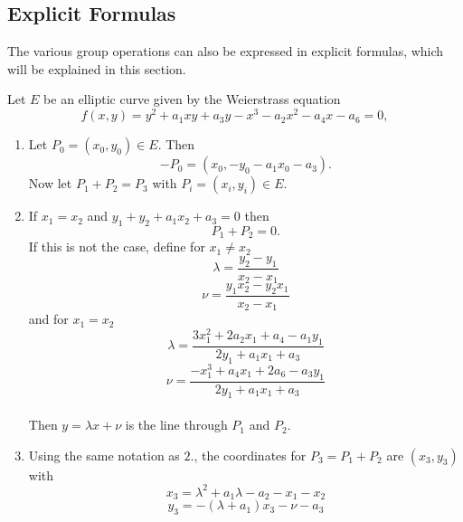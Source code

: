 \subsection{Explicit Formulas}
The various group operations can also be expressed in explicit formulas, which will be explained in this section.
\begin{thm}
	Let $E$ be an elliptic curve given by the Weierstrass equation
	\begin{equation*}
	f(x,y)=y^2+a_1xy+a_3y-x^3-a_2x^2-a_4x-a_6=0,
	\end{equation*}
	\text\linebreak
	\begin{enumerate}
		\item Let $P_0=(x_0,y_0)\in E$. Then
		\begin{equation*}
		-P_0=(x_0,-y_0-a_1x_0-a_3).
		\end{equation*}
		Now let $P_1+P_2=P_3$ with $P_i=(x_i,y_i)\in E$.
		\item If $x_1=x_2$ and $y_1+y_2+a_1x_2+a_3=0$ then
		\begin{equation*}
		P_1+P_2=0.
		\end{equation*}
		If this is not the case, define for $x_1\neq x_2$
		\begin{equation*}
		\lambda=\frac{y_2-y_1}{x_2-x_1}
		\end{equation*}
		\begin{equation*}
		\nu=\frac{y_1x_2-y_2x_1}{x_2-x_1}
		\end{equation*}
		and for $x_1=x_2$
		\begin{equation*}
		\lambda=\frac{3x_1^2+2a_2x_1+a_4-a_1y_1}{2y_1+a_1x_1+a_3}
		\end{equation*}
		\begin{equation*}
		\nu=\frac{-x_1^3+a_4x_1+2a_6-a_3y_1}{2y_1+a_1x_1+a_3}
		\end{equation*}
		\\
		Then $y=\lambda x+\nu$ is the line through $P_1$ and $P_2$.
		\item Using the same notation as $2.$, the coordinates for $P_3=P_1+P_2$ are $(x_3,y_3)$ with
		\begin{equation*}
		x_3=\lambda^2+a_1\lambda-a_2-x_1-x_2
		\end{equation*}
		\begin{equation*}
		y_3=-(\lambda+a_1)x_3-\nu-a_3
		\end{equation*}
	\end{enumerate}
\end{thm}
